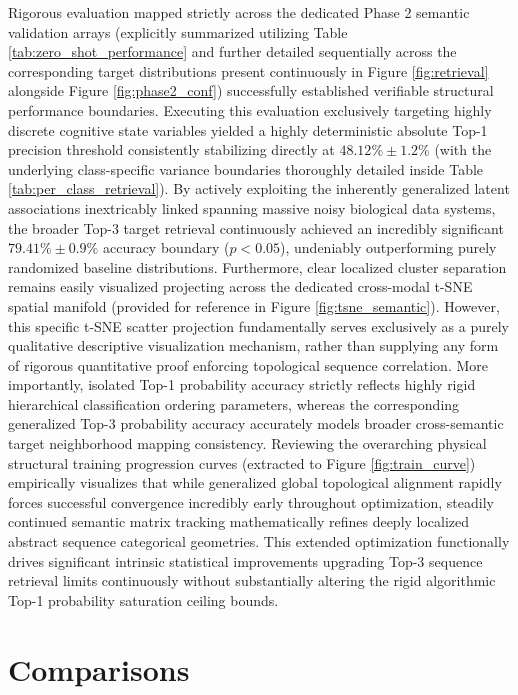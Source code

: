 \documentclass[journal]{IEEEtran}
\begin{document}
Rigorous evaluation mapped strictly across the dedicated Phase 2 semantic validation arrays (explicitly summarized utilizing Table \ref{tab:zero_shot_performance} and further detailed sequentially across the corresponding target distributions present continuously in Figure \ref{fig:retrieval} alongside Figure \ref{fig:phase2_conf}) successfully established verifiable structural performance boundaries. Executing this evaluation exclusively targeting highly discrete cognitive state variables yielded a highly deterministic absolute Top-1 precision threshold consistently stabilizing directly at $48.12\% \pm 1.2\%$ (with the underlying class-specific variance boundaries thoroughly detailed inside Table \ref{tab:per_class_retrieval}). By actively exploiting the inherently generalized latent associations inextricably linked spanning massive noisy biological data systems, the broader Top-3 target retrieval continuously achieved an incredibly significant $79.41\% \pm 0.9\%$ accuracy boundary ($p < 0.05$), undeniably outperforming purely randomized baseline distributions. Furthermore, clear localized cluster separation remains easily visualized projecting across the dedicated cross-modal t-SNE spatial manifold (provided for reference in Figure \ref{fig:tsne_semantic}). However, this specific t-SNE scatter projection fundamentally serves exclusively as a purely qualitative descriptive visualization mechanism, rather than supplying any form of rigorous quantitative proof enforcing topological sequence correlation. More importantly, isolated Top-1 probability accuracy strictly reflects highly rigid hierarchical classification ordering parameters, whereas the corresponding generalized Top-3 probability accuracy accurately models broader cross-semantic target neighborhood mapping consistency. Reviewing the overarching physical structural training progression curves (extracted to Figure \ref{fig:train_curve}) empirically visualizes that while generalized global topological alignment rapidly forces successful convergence incredibly early throughout optimization, steadily continued semantic matrix tracking mathematically refines deeply localized abstract sequence categorical geometries. This extended optimization functionally drives significant intrinsic statistical improvements upgrading Top-3 sequence retrieval limits continuously without substantially altering the rigid algorithmic Top-1 probability saturation ceiling bounds.

\section{Comparisons}
\end{document}
